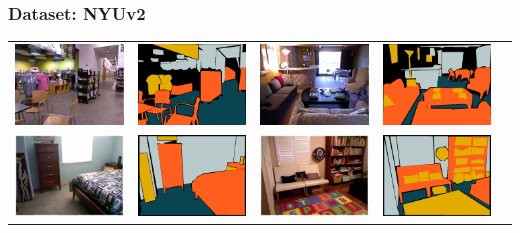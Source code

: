 \documentclass[final,ignorenonframetext,compress]{beamer}
\begin{document}
    \begin{frame}
        \frametitle{Dataset: NYUv2}
        \begin{tabularx}{\linewidth}{@{\extracolsep{\fill}}ccccc}

        \includegraphics[width=.22\textwidth]{images/00118_image.png}&%
        \includegraphics[width=.22\linewidth]{images/00118_gt.png}&
        \includegraphics[width=.22\textwidth]{images/01203_image.png}&%
        \includegraphics[width=.22\linewidth]{images/01203_gt.png}\\

        \includegraphics[width=.22\textwidth]{images/01147_image.png}&%
        \includegraphics[width=.22\linewidth]{images/01147_gt.png}&
        \includegraphics[width=.22\textwidth]{images/00281_image.png}&%
        \includegraphics[width=.22\linewidth]{images/00281_gt.png}\\


\end{tabularx}
\end{frame}
\end{document}
